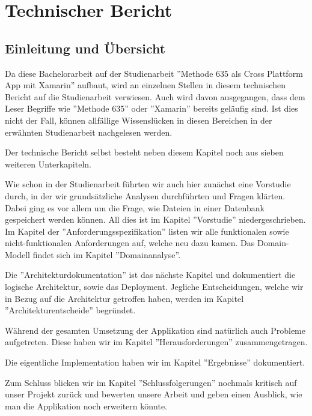 \section{Technischer Bericht}

\subsection{Einleitung und Übersicht}
Da diese Bachelorarbeit auf der Studienarbeit ''Methode 635 als Cross Plattform App mit Xamarin'' \cite{methode635-sa} aufbaut, wird an einzelnen Stellen in diesem technischen Bericht auf die Studienarbeit verwiesen. Auch wird davon ausgegangen, dass dem Leser Begriffe wie ''Methode 635'' oder ''Xamarin'' bereits geläufig sind. Ist dies nicht der Fall, können allfällige Wissenslücken in diesen Bereichen in der erwähnten Studienarbeit nachgelesen werden.

Der technische Bericht selbst besteht neben diesem Kapitel noch aus sieben weiteren Unterkapiteln. 

Wie schon in der Studienarbeit führten wir auch hier zunächst eine Vorstudie durch, in der wir grundsätzliche Analysen durchführten und Fragen klärten. Dabei ging es vor allem um die Frage, wie Dateien in einer Datenbank gespeichert werden können. All dies ist im Kapitel ''Vorstudie'' niedergeschrieben.
Im Kapitel der ''Anforderungsspezifikation'' listen wir alle funktionalen sowie nicht-funktionalen Anforderungen auf, welche neu dazu kamen. Das Domain-Modell findet sich im Kapitel ''Domainanalyse''.

Die ''Architektur\-dokumentation'' ist das nächste Kapitel und dokumentiert die logische Architektur, sowie das Deployment. Jegliche Entscheidungen, welche wir in Bezug auf die Architektur getroffen haben, werden im Kapitel ''Architekturentscheide'' begründet.

Während der gesamten Umsetzung der Applikation sind natürlich auch Probleme aufgetreten. Diese haben wir im Kapitel ''Herausforderungen'' zusammengetragen.

Die eigentliche Implementation haben wir im Kapitel ''Ergebnisse'' dokumentiert.

Zum Schluss blicken wir im Kapitel ''Schlussfolgerungen'' nochmals kritisch auf unser Projekt zurück und bewerten unsere Arbeit und geben einen Ausblick, wie man die Applikation noch erweitern könnte.





\newpage


\newpage


\newpage


\newpage


\newpage


\newpage


\newpage


\newpage

